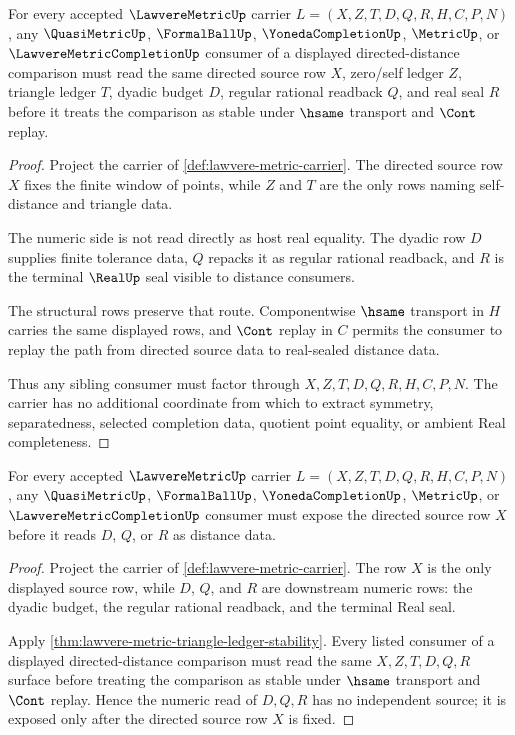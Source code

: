 \begin{theorem}
\label{thm:lawvere-metric-triangle-ledger-stability}
For every accepted $\LawvereMetricUp$ carrier $L=(X,Z,T,D,Q,R,H,C,P,N)$, any $\QuasiMetricUp$, $\FormalBallUp$, $\YonedaCompletionUp$, $\MetricUp$, or $\LawvereMetricCompletionUp$ consumer of a displayed directed-distance comparison must read the same directed source row $X$, zero/self ledger $Z$, triangle ledger $T$, dyadic budget $D$, regular rational readback $Q$, and real seal $R$ before it treats the comparison as stable under $\hsame$ transport and $\Cont$ replay.
\end{theorem}
\begin{proof}
Project the carrier of \autoref{def:lawvere-metric-carrier}. The directed source row $X$ fixes the finite window of points, while $Z$ and $T$ are the only rows naming self-distance and triangle data.

The numeric side is not read directly as host real equality. The dyadic row $D$ supplies finite tolerance data, $Q$ repacks it as regular rational readback, and $R$ is the terminal $\RealUp$ seal visible to distance consumers.

The structural rows preserve that route. Componentwise $\hsame$ transport in $H$ carries the same displayed rows, and $\Cont$ replay in $C$ permits the consumer to replay the path from directed source data to real-sealed distance data.

Thus any sibling consumer must factor through $X,Z,T,D,Q,R,H,C,P,N$. The carrier has no additional coordinate from which to extract symmetry, separatedness, selected completion data, quotient point equality, or ambient Real completeness.
\end{proof}

\begin{theorem}
\label{thm:lawvere-metric-source-exposure}
For every accepted $\LawvereMetricUp$ carrier $L=(X,Z,T,D,Q,R,H,C,P,N)$, any $\QuasiMetricUp$, $\FormalBallUp$, $\YonedaCompletionUp$, $\MetricUp$, or $\LawvereMetricCompletionUp$ consumer must expose the directed source row $X$ before it reads $D$, $Q$, or $R$ as distance data.
\end{theorem}
\begin{proof}
Project the carrier of \autoref{def:lawvere-metric-carrier}. The row $X$ is the only displayed source row, while $D$, $Q$, and $R$ are downstream numeric rows: the dyadic budget, the regular rational readback, and the terminal Real seal.

Apply \autoref{thm:lawvere-metric-triangle-ledger-stability}. Every listed consumer of a displayed directed-distance comparison must read the same $X,Z,T,D,Q,R$ surface before treating the comparison as stable under $\hsame$ transport and $\Cont$ replay. Hence the numeric read of $D,Q,R$ has no independent source; it is exposed only after the directed source row $X$ is fixed.
\end{proof}

